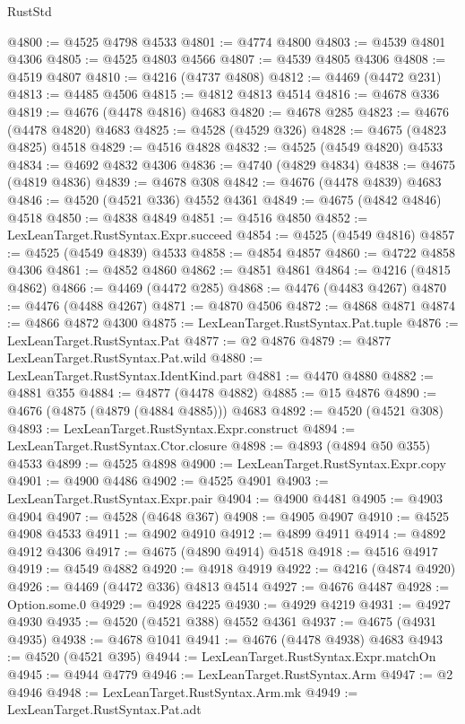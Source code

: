 \begin{lexlean}{RustStd}
\begin{coremodule}
{\begin{coremodule}
{{{{{{{{{{{{{{{{{{{{{{{{{{{{{{{{{{{{{{{{{{{{{{{{{{{{{{{{{{{{@4800 := @4525 @4798 @4533
@4801 := @4774 @4800
@4803 := @4539 @4801 @4306
@4805 := @4525 @4803 @4566
@4807 := @4539 @4805 @4306
@4808 := @4519 @4807
@4810 := @4216 (@4737 @4808)
@4812 := @4469 (@4472 @231)
@4813 := @4485 @4506
@4815 := @4812 @4813 @4514
@4816 := @4678 @336
@4819 := @4676 (@4478 @4816) @4683
@4820 := @4678 @285
@4823 := @4676 (@4478 @4820) @4683
@4825 := @4528 (@4529 @326)
@4828 := @4675 (@4823 @4825) @4518
@4829 := @4516 @4828
@4832 := @4525 (@4549 @4820) @4533
@4834 := @4692 @4832 @4306
@4836 := @4740 (@4829 @4834)
@4838 := @4675 (@4819 @4836)
@4839 := @4678 @308
@4842 := @4676 (@4478 @4839) @4683
@4846 := @4520 (@4521 @336) @4552 @4361
@4849 := @4675 (@4842 @4846) @4518
@4850 := @4838 @4849
@4851 := @4516 @4850
@4852 := LexLeanTarget.RustSyntax.Expr.succeed
@4854 := @4525 (@4549 @4816)
@4857 := @4525 (@4549 @4839) @4533
@4858 := @4854 @4857
@4860 := @4722 @4858 @4306
@4861 := @4852 @4860
@4862 := @4851 @4861
@4864 := @4216 (@4815 @4862)
@4866 := @4469 (@4472 @285)
@4868 := @4476 (@4483 @4267)
@4870 := @4476 (@4488 @4267)
@4871 := @4870 @4506
@4872 := @4868 @4871
@4874 := @4866 @4872 @4300
@4875 := LexLeanTarget.RustSyntax.Pat.tuple
@4876 := LexLeanTarget.RustSyntax.Pat
@4877 := @2 @4876
@4879 := @4877 LexLeanTarget.RustSyntax.Pat.wild
@4880 := LexLeanTarget.RustSyntax.IdentKind.part
@4881 := @4470 @4880
@4882 := @4881 @355
@4884 := @4877 (@4478 @4882)
@4885 := @15 @4876
@4890 := @4676 (@4875 (@4879 (@4884 @4885))) @4683
@4892 := @4520 (@4521 @308)
@4893 := LexLeanTarget.RustSyntax.Expr.construct
@4894 := LexLeanTarget.RustSyntax.Ctor.closure
@4898 := @4893 (@4894 @50 @355) @4533
@4899 := @4525 @4898
@4900 := LexLeanTarget.RustSyntax.Expr.copy
@4901 := @4900 @4486
@4902 := @4525 @4901
@4903 := LexLeanTarget.RustSyntax.Expr.pair
@4904 := @4900 @4481
@4905 := @4903 @4904
@4907 := @4528 (@4648 @367)
@4908 := @4905 @4907
@4910 := @4525 @4908 @4533
@4911 := @4902 @4910
@4912 := @4899 @4911
@4914 := @4892 @4912 @4306
@4917 := @4675 (@4890 @4914) @4518
@4918 := @4516 @4917
@4919 := @4549 @4882
@4920 := @4918 @4919
@4922 := @4216 (@4874 @4920)
@4926 := @4469 (@4472 @336) @4813 @4514
@4927 := @4676 @4487
@4928 := Option.some.{0}
@4929 := @4928 @4225
@4930 := @4929 @4219
@4931 := @4927 @4930
@4935 := @4520 (@4521 @388) @4552 @4361
@4937 := @4675 (@4931 @4935)
@4938 := @4678 @1041
@4941 := @4676 (@4478 @4938) @4683
@4943 := @4520 (@4521 @395)
@4944 := LexLeanTarget.RustSyntax.Expr.matchOn
@4945 := @4944 @4779
@4946 := LexLeanTarget.RustSyntax.Arm
@4947 := @2 @4946
@4948 := LexLeanTarget.RustSyntax.Arm.mk
@4949 := LexLeanTarget.RustSyntax.Pat.adt
}}}}}}}}}}}}}}}}}}}}}}}}}}}}}}}}}}}}}}}}}}}}}}}}}}}}}}}}}}}}
\end{coremodule}}
\end{coremodule}
\end{lexlean}
